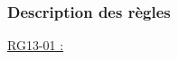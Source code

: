 \documentclass{report}
\begin{document}
		\subsubsection{Description des règles}

			\underline{RG13-01 :}
				\begin{quote}
				
				\end{quote}	
\end{document}
